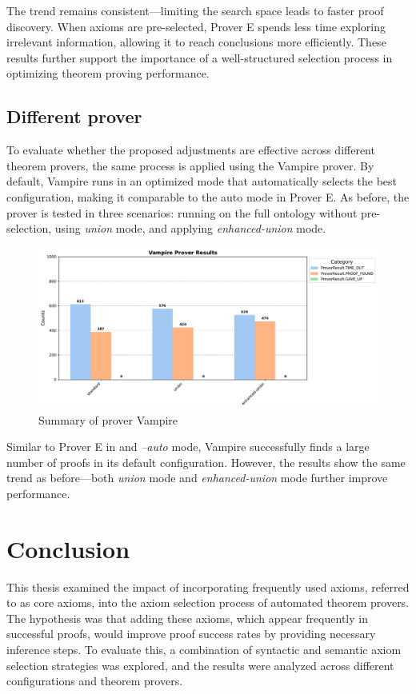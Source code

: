 \documentclass[english,version-2020-11]{uzl-thesis}
\begin{document}
The trend remains consistent—limiting the search space leads to faster proof discovery. When axioms are pre-selected, Prover E spends less time exploring irrelevant information, allowing it to reach conclusions more efficiently. These results further support the importance of a well-structured selection process in optimizing theorem proving performance.


\section{Different prover}
To evaluate whether the proposed adjustments are effective across different theorem provers, the same process is applied using the Vampire prover. By default, Vampire runs in an optimized mode that automatically selects the best configuration, making it comparable to the auto mode in Prover E. As before, the prover is tested in three scenarios: running on the full ontology without pre-selection, using \textit{union} mode, and applying \textit{enhanced-union} mode.

\begin{figure}[h!]
    \centering
    \includegraphics[width=\textwidth]{vampire_mode_output.pdf}
    \caption{Summary of prover Vampire}
    \label{fig:prover_results_vampire}
\end{figure}
\FloatBarrier

Similar to Prover E in  and \textit{--auto} mode, Vampire successfully finds a large number of proofs in its default configuration. However, the results show the same trend as before—both \textit{union} mode and \textit{enhanced-union} mode further improve performance.
 


\chapter{Conclusion}
\label{chapter-conclusion}
This thesis examined the impact of incorporating frequently used axioms, referred to as core axioms, into the axiom selection process of automated theorem provers. The hypothesis was that adding these axioms, which appear frequently in successful proofs, would improve proof success rates by providing necessary inference steps. To evaluate this, a combination of syntactic and semantic axiom selection strategies was explored, and the results were analyzed across different configurations and theorem provers.
\end{document}
